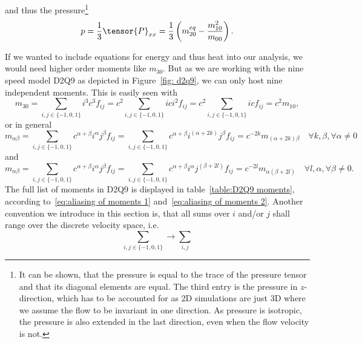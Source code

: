 and thus the pressure\footnote{It can be shown, that the pressure is equal to the trace of the pressure tensor and that its diagonal elements are equal. The third entry is the pressure in $z$-direction, which has to be accounted for as 2D simulations are just 3D where we assume the flow to be invariant in one direction. As pressure is isotropic, the pressure is also extended in the last direction, even when the flow velocity is not.}
\begin{equation}
  p=\frac{1}{3} \tensor{P}_{xx} = \frac{1}{3} \left(m_{20}^{eq} - \frac{m_{10}^2}{m_{00}}\right).
\end{equation}

If we wanted to include equations for energy and thus heat into our analysis, we would need higher order moments like $m_{30}$.
But as we are working with the nine speed model D2Q9 as depicted in Figure~\ref{fig: d2q9}, we can only host nine independent moments.
This is easily seen with
\begin{equation}
  m_{30} = \sum_{i,j \in \{-1,0,1\}} i^3 c^3 f_{ij} = c^2\sum_{i,j \in \{-1,0,1\}} ic i^2 f_{ij} = c^2 \sum_{i,j \in \{-1,0,1\}} ic f_{ij} = c^2 m_{10},
\end{equation}
or in general
\begin{equation}
  \label{eq:aliasing of moments 1}
  m_{\alpha\beta}
  = \sum_{i,j \in \{-1,0,1\}} c^{\alpha+\beta} i^\alpha j^\beta f_{ij}
  = \sum_{i,j \in \{-1,0,1\}} c^{\alpha+\beta}i^{(\alpha+2k)} j^\beta f_{ij}
  = c^{-2k} m_{(\alpha+2k)\beta} \quad \forall k,\beta, \forall \alpha \neq 0
\end{equation}
and
\begin{equation}
  \label{eq:aliasing of moments 2}
  m_{\alpha\beta}
  = \sum_{i,j \in \{-1,0,1\}} c^{\alpha+\beta} i^\alpha j^\beta f_{ij}
  = \sum_{i,j \in \{-1,0,1\}} c^{\alpha+\beta}i^\alpha j^{(\beta+2l)} f_{ij}
  = c^{-2l}m_{\alpha(\beta+2l)} \quad \forall l, \alpha, \forall \beta \neq 0.
\end{equation}
The full list of moments in D2Q9 is displayed in table~\ref{table:D2Q9 moments}, according to~\eqref{eq:aliasing of moments 1} and~\eqref{eq:aliasing of moments 2}.
Another convention we introduce in this section is, that all sums over $i$ and/or $j$ shall range over the discrete velocity space, i.e.
\begin{equation*}
  \sum_{i,j \in \{-1,0,1\}} \rightarrow \sum_{i,j}
\end{equation*}

